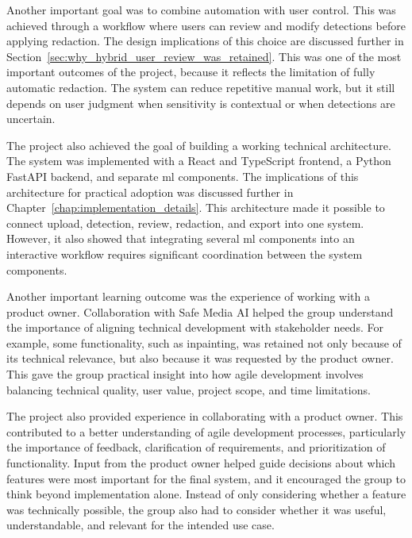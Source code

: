 Another important goal was to combine automation with user control. This was achieved through a workflow where users can review and modify detections before applying redaction. The design implications of this choice are discussed further in Section~\ref{sec:why_hybrid_user_review_was_retained}. This was one of the most important outcomes of the project, because it reflects the limitation of fully automatic redaction. The system can reduce repetitive manual work, but it still depends on user judgment when sensitivity is contextual or when detections are uncertain.

The project also achieved the goal of building a working technical architecture. The system was implemented with a React and TypeScript frontend, a Python FastAPI backend, and separate \acrshort{ml} components. The implications of this architecture for practical adoption was discussed further in Chapter~\ref{chap:implementation_details}. This architecture made it possible to connect upload, detection, review, redaction, and export into one system. However, it also showed that integrating several \acrshort{ml} components into an interactive workflow requires significant coordination between the system components.

Another important learning outcome was the experience of working with a product owner. Collaboration with Safe Media AI helped the group understand the importance of aligning technical development with stakeholder needs. For example, some functionality, such as \gls{inpainting}, was retained not only because of its technical relevance, but also because it was requested by the product owner. This gave the group practical insight into how agile development involves balancing technical quality, user value, project scope, and time limitations.

The project also provided experience in collaborating with a product owner. This contributed to a better understanding of agile development processes, particularly the importance of feedback, clarification of requirements, and prioritization of functionality. Input from the product owner helped guide decisions about which features were most important for the final system, and it encouraged the group to think beyond implementation alone. Instead of only considering whether a feature was technically possible, the group also had to consider whether it was useful, understandable, and relevant for the intended use case. 

